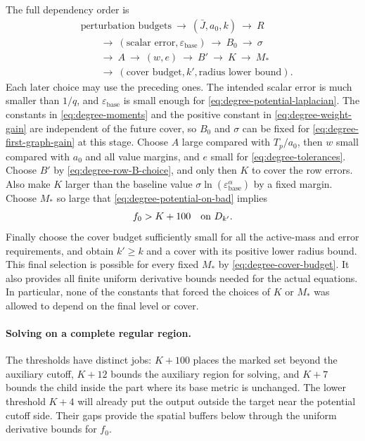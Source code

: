 The full dependency order is
\[
 \begin{aligned}
 &\text{perturbation budgets}\ \longrightarrow\ (\bar J,a_0,k)
       \ \longrightarrow\ R\\
 &\qquad\longrightarrow\ (\text{scalar error},\varepsilon_{\mathrm{base}})
       \ \longrightarrow\ B_0\ \longrightarrow\ \sigma\\
 &\qquad\longrightarrow\ A\ \longrightarrow\ (w,e)
       \ \longrightarrow\ B'\ \longrightarrow\ K\ \longrightarrow\ M_*\\
 &\qquad\longrightarrow\ (\text{cover budget},k',\text{radius lower bound}).
 \end{aligned}
\]
Each later choice may use the preceding ones.  The intended scalar error
is much smaller than $1/q$, and $\varepsilon_{\mathrm{base}}$ is small
enough for \eqref{eq:degree-potential-laplacian}.  The constants in
\eqref{eq:degree-moments} and the positive constant in
\eqref{eq:degree-weight-gain} are independent of the future cover, so
$B_0$ and $\sigma$ can be fixed for
\eqref{eq:degree-first-graph-gain} at this stage.  Choose $A$ large compared with
$T_p/a_0$, then $w$ small compared with $a_0$ and all value margins,
and $e$ small for \eqref{eq:degree-tolerances}.  Choose $B'$ by
\eqref{eq:degree-row-B-choice}, and only then $K$ to cover the row errors.
Also make $K$ larger than the baseline value
$\sigma\ln(\varepsilon_{\mathrm{base}}^\alpha)$ by a fixed margin.
Choose $M_*$ so large that
\eqref{eq:degree-potential-on-bad} implies
\begin{equation}\label{eq:degree-high-on-bad}
                        f_0>K+100\quad\hbox{on }D_{k'}.
\end{equation}
Finally choose the cover budget sufficiently small for all the active-mass
and error requirements, and obtain $k'\ge k$ and a cover with its positive
lower radius bound.  This final selection is possible for every fixed
$M_*$ by \eqref{eq:degree-cover-budget}.  It also provides all finite
uniform derivative bounds needed for the actual equations.  In
particular, none of the constants that forced the choices of $K$ or $M_*$
was allowed to depend on the final level or cover.

\paragraph{Solving on a complete regular region.}
The thresholds have distinct jobs: $K+100$ places the marked set beyond
the auxiliary cutoff,
$K+12$ bounds the auxiliary region for solving, and $K+7$ bounds the
child inside the part where its base metric is unchanged.  The lower
threshold $K+4$ will already put the output outside the target near the
potential cutoff side.  Their gaps provide the spatial buffers below
through the uniform derivative bounds for $f_0$.

